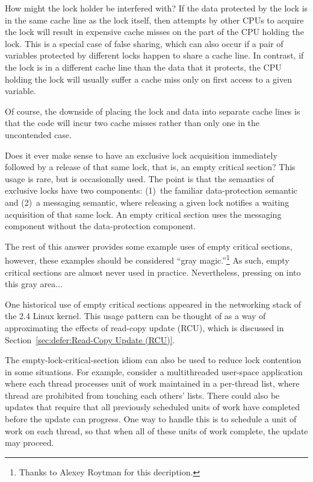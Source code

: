 \QuickQ{}
	How might the lock holder be interfered with?
\QuickA{}
	If the data protected by the lock is in the same cache line
	as the lock itself, then attempts by other CPUs to acquire
	the lock will result in expensive cache misses on the part
	of the CPU holding the lock.
	This is a special case of false sharing, which can also occur
	if a pair of variables protected by different locks happen
	to share a cache line.
	In contrast, if the lock is in a different cache line than
	the data that it protects, the CPU holding the lock will
	usually suffer a cache miss only on first access to a given
	variable.

	Of course, the downside of placing the lock and data into separate
	cache lines is that the code will incur two cache misses rather
	than only one in the uncontended case.

\QuickQ{}
	Does it ever make sense to have an exclusive lock acquisition
	immediately followed by a release of that same lock, that is,
	an empty critical section?
\QuickA{}
	This usage is rare, but is occasionally used.
	The point is that the semantics of exclusive locks have two
	components: (1)~the familiar data-protection semantic and
	(2)~a messaging semantic, where releasing a given lock notifies
	a waiting acquisition of that same lock.
	An empty critical section uses the messaging component without
	the data-protection component.

	The rest of this answer provides some example uses of empty
	critical sections, however, these examples should be considered
	``gray magic.''\footnote{
		Thanks to Alexey Roytman for this decription.}
	As such, empty critical sections are almost never used in practice.
	Nevertheless, pressing on into this gray area...

	One historical use of empty critical sections appeared in the
	networking stack of the 2.4 Linux kernel.
	This usage pattern can be thought of as a way of approximating
	the effects of read-copy update (RCU), which is discussed in
	Section~\ref{sec:defer:Read-Copy Update (RCU)}.

	The empty-lock-critical-section idiom can also be used to
	reduce lock contention in some situations.
	For example, consider a multithreaded user-space application where
	each thread processes unit of work maintained in a per-thread
	list, where thread are prohibited from touching each others'
	lists.
	There could also be updates that require that all previously
	scheduled units of work have completed before the update can
	progress.
	One way to handle this is to schedule a unit of work on each
	thread, so that when all of these units of work complete, the
	update may proceed.

